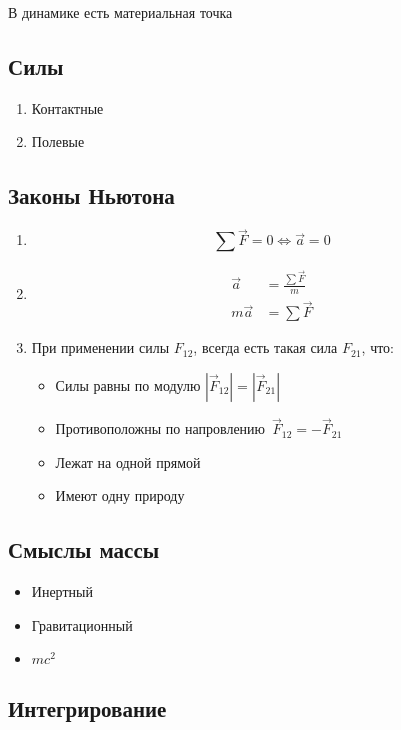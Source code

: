 \documentclass{article}
\begin{document}
В динамике есть материальная точка

\subsection{Силы}

\begin{enumerate}
	\item Контактные
	\item Полевые
\end{enumerate}

\subsection{Законы Ньютона}

\begin{enumerate}
	\item \[ \sum \vec{F} = 0 \Leftrightarrow \vec{a} = 0 \]
	\item \begin{align*}
		\vec{a} &= \frac{\sum \vec{F}}{m} \\
		m \vec{a} &= \sum \vec{F} 
	\end{align*}
	\item При применении силы $F_{12}$, всегда есть такая сила $F_{21}$, что:
	\begin{itemize}
		\item Силы равны по модулю $|\vec{F}_{12}| = |\vec{F}_{21}|$
		\item Противоположны по напровлению\ $\vec{F}_{12} = -\vec{F}_{21}$
		\item Лежат на одной прямой
		\item Имеют одну природу
	\end{itemize}
\end{enumerate}

\subsection{Смыслы массы}

\begin{itemize}
	\item Инертный
	\item Гравитационный
	\item $mc^2$
\end{itemize}

\subsection{Интегрирование}
\end{document}
